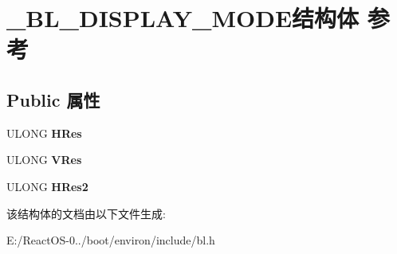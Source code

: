 \hypertarget{struct___b_l___d_i_s_p_l_a_y___m_o_d_e}{}\section{\+\_\+\+B\+L\+\_\+\+D\+I\+S\+P\+L\+A\+Y\+\_\+\+M\+O\+D\+E结构体 参考}
\label{struct___b_l___d_i_s_p_l_a_y___m_o_d_e}
\subsection*{Public 属性}
\begin{DoxyCompactItemize}
\item 
\mbox{\label{struct___b_l___d_i_s_p_l_a_y___m_o_d_e_aa9ce100f9a8fa0a0458fee9beaa5fd61}} 
U\+L\+O\+NG {\bfseries H\+Res}
\item 
\mbox{\label{struct___b_l___d_i_s_p_l_a_y___m_o_d_e_af5c92743e508704940d311b1920062d2}} 
U\+L\+O\+NG {\bfseries V\+Res}
\item 
\mbox{\label{struct___b_l___d_i_s_p_l_a_y___m_o_d_e_a382c1f7cead205d27866de910b3b84e8}} 
U\+L\+O\+NG {\bfseries H\+Res2}
\end{DoxyCompactItemize}


该结构体的文档由以下文件生成\+:\begin{DoxyCompactItemize}
\item 
E\+:/\+React\+O\+S-\/0../boot/environ/include/bl.\+h\end{DoxyCompactItemize}
